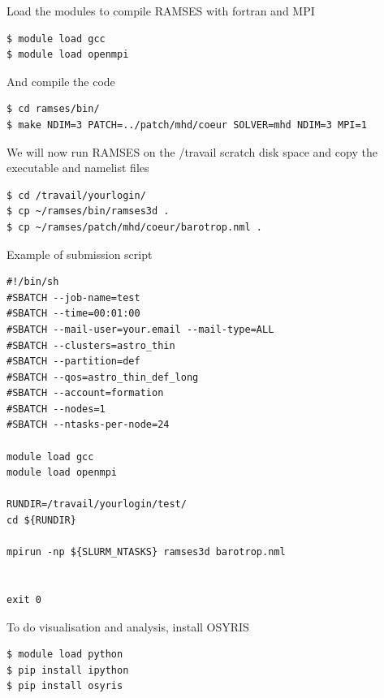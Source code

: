 \documentclass{article}
\begin{document}
Load the modules to compile RAMSES with fortran and MPI
\begin{lstlisting}[]
$ module load gcc 
$ module load openmpi
\end{lstlisting}

And compile the code
\begin{lstlisting}[]
$ cd ramses/bin/
$ make NDIM=3 PATCH=../patch/mhd/coeur SOLVER=mhd NDIM=3 MPI=1
\end{lstlisting}

We will now run RAMSES on the /travail scratch disk space and copy the executable and namelist files
\begin{lstlisting}[]
$ cd /travail/yourlogin/
$ cp ~/ramses/bin/ramses3d .
$ cp ~/ramses/patch/mhd/coeur/barotrop.nml .
\end{lstlisting}

Example of submission script
\begin{lstlisting}[]
#!/bin/sh
#SBATCH --job-name=test
#SBATCH --time=00:01:00
#SBATCH --mail-user=your.email --mail-type=ALL
#SBATCH --clusters=astro_thin
#SBATCH --partition=def
#SBATCH --qos=astro_thin_def_long
#SBATCH --account=formation
#SBATCH --nodes=1
#SBATCH --ntasks-per-node=24

module load gcc
module load openmpi

RUNDIR=/travail/yourlogin/test/
cd ${RUNDIR}

mpirun -np ${SLURM_NTASKS} ramses3d barotrop.nml


exit 0
\end{lstlisting}

To do visualisation and analysis, install OSYRIS

\begin{lstlisting}[]
$ module load python
$ pip install ipython
$ pip install osyris
\end{lstlisting}
\end{document}
